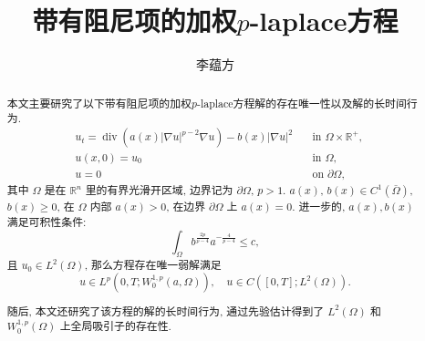 \documentclass[oneside,longtitle]{LZUthesis}
\theoremstyle{definition}
\numberwithin{equation}{chapter}
\newcommand*\abs[1]{\lvert#1\rvert}
\newcommand\R{\mathbb{R}}
\DeclareMathOperator{\Div}{div}
\begin{document}
\classification{}

\confidential{}

\title{带有阻尼项的加权$p$-laplace方程}




\author{李蕴方}






\submitdate{}


\degreedate{}


\maketitle

\makestatement

\frontmatter{}

\begin{abstract}
	本文主要研究了以下带有阻尼项的加权$p$-laplace方程解的存在唯一性以及解的长时间行为.
	\begin{equation*}
		\begin{alignedat}{2}
			& u_t = \Div(a(x)\abs{\nabla u}^{p-2}\nabla u) - b(x)\abs{\nabla u}^2 \quad &\text{in } \Omega \times \R^+,\\
			& u(x,0) = u_0 \quad &\text{in } \Omega,\\
			& u = 0 \quad &\text{on } \partial\Omega,
		\end{alignedat}
	\end{equation*}
	其中 $\Omega$ 是在 $\R^{n}$ 里的有界光滑开区域, 边界记为 $\partial\Omega$, $p>1$.
	$ a(x)$, $b(x) \in C^1(\bar{\Omega}) $, $b(x) \geq 0$, 在 $\Omega$ 内部 $a(x) > 0$, 在边界 $\partial\Omega$ 上 $a(x) = 0$.
	进一步的, $a(x), b(x)$ 满足可积性条件:
	\begin{equation*}
		\int_{\Omega} b^{\frac{2p}{p-4}}a^{-\frac{4}{p-4}} \leq c,
	\end{equation*}
	且 $u_0 \in L^2(\Omega) $, 那么方程存在唯一弱解满足
	\begin{equation}
		u \in L^p(0, T; W_0^{1,p}(a,\Omega)), \quad u \in C([0, T]; L^2(\Omega)).
	\end{equation}

	随后, 本文还研究了该方程的解的长时间行为, 通过先验估计得到了 $L^2(\Omega)$ 和 $W_0^{1,p}(\Omega)$ 上全局吸引子的存在性.
\end{abstract}
\end{document}
